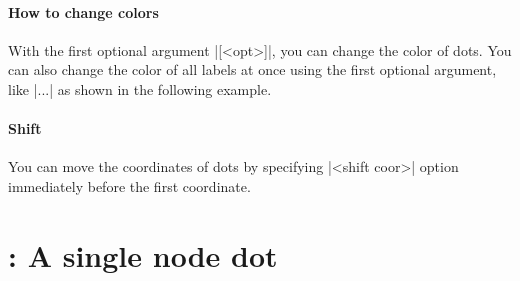 \begin{tzcode}{.3}
\end{tzcode}



\paragraph{How to change colors}

With the first optional argument |[<opt>]|, you can change the color of dots.
You can also change the color of all labels at once using the first optional argument, 
like |\tzcdots[text=red]...| as shown in the following example.

\begin{tzcode}{.3}
\end{tzcode}

\paragraph{Shift} You can move the coordinates of dots by specifying |<shift coor>| option immediately before the first coordinate.

\begin{tzcode}{.3}
\end{tzcode}


\section{\protect\cmd{\tzdot(*)}: A single node dot}
\label{s:tzdot}

